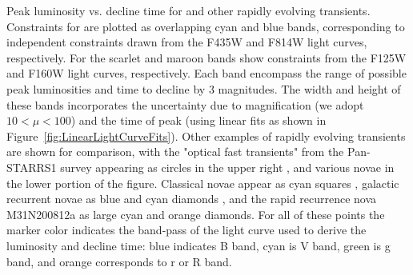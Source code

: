 Peak luminosity vs. decline time for \spock and other rapidly evolving transients.  Constraints for \spockone are plotted as overlapping cyan and blue bands, corresponding to independent constraints drawn from the F435W and F814W light curves, respectively.  For \spocktwo the scarlet and maroon bands show constraints from the F125W and F160W light curves, respectively.  Each band encompass the range of possible peak luminosities and time to decline by 3 magnitudes. The width and height of these bands incorporates the uncertainty due to magnification (we adopt $10<\mu<100$) and the time of peak (using linear fits as shown in Figure~\ref{fig:LinearLightCurveFits}).   Other examples of rapidly evolving transients are shown for comparison, with the "optical fast transients" from the Pan-STARRS1 survey appearing as circles in the upper right \citep{Drout:2014a}, and various novae in the lower portion of the figure. Classical novae appear as cyan squares \citep{Downes:2000}, galactic recurrent novae as blue and cyan diamonds \citep{Schaefer:2010}, and the rapid recurrence nova M31N200812a as large cyan and orange diamonds.  For all of these points the marker color indicates the band-pass of the light curve used to derive the luminosity and decline time: blue indicates B band, cyan is V band, green is g band, and orange corresponds to r or R band.